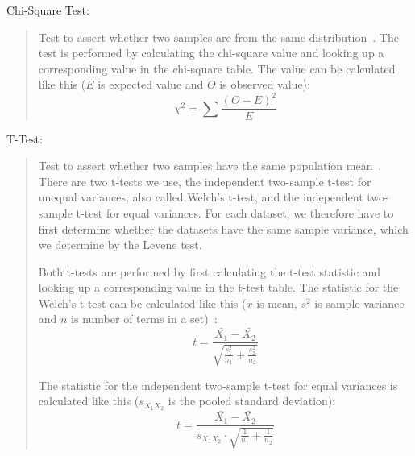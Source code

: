 \begin{framed}
  \newpage
  \hypertarget{metric:chi}{Chi-Square Test:}
  \begin{quote}
    Test to assert whether two samples are from the same distribution~\cite[Chapter~14]{press1996numerical}. The test is performed by calculating the chi-square value and looking up a corresponding value in the chi-square table. The value can be calculated like this ($E$ is expected value and $O$ is observed value):
    $$\chi^2 = \sum\frac{(O - E)^2}{E}$$
  \end{quote}

  \hypertarget{metric:tt}{T-Test:}
  \begin{quote}
    Test to assert whether two samples have the same population mean~\cite{Ruxton01072006}. There are two t-tests we use, the independent two-sample t-test for unequal variances, also called Welch's t-test, and the independent two-sample t-test for equal variances. For each dataset, we therefore have to first determine whether the datasets have the same sample variance, which we determine by the Levene test.

    Both t-tests are performed by first calculating the t-test statistic and looking up a corresponding value in the t-test table. The statistic for the Welch's t-test can be calculated like this ($\bar{x}$ is mean, $s^2$ is sample variance and $n$ is number of terms in a set)~\cite{Ruxton01072006}:
    $$t = \frac{\bar{X_1} - \bar{X_2}}{\sqrt{\frac{s_1^2}{n_1} + \frac{s_2^2}{n_2}}}$$

    The statistic for the independent two-sample t-test for equal variances is calculated like this ($s_{X_1 X_2}$ is the pooled standard deviation):
    $$t = \frac{\bar{X_1} - \bar{X_2}}{s_{X_1 X_2} \cdot \sqrt{\frac{1}{n_1} + \frac{1}{n_2}}}$$
  \end{quote}
\end{framed}

